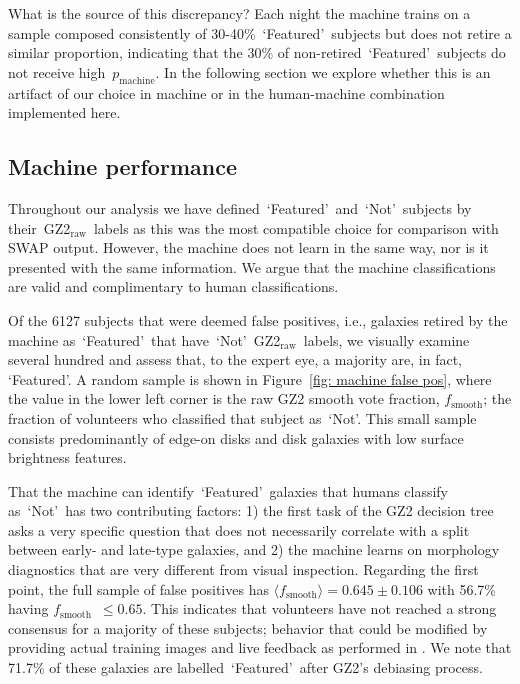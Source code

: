 \documentclass[twocolumn, trackchanges, linenumbers]{aastex6}%
\newcommand{\feat}{`Featured'}
\newcommand{\notfeat}{`Not'}
\newcommand{\raw}{GZ2$_{\text{raw}}$}
\newcommand{\pmachine}{$p_{\mathrm{machine}}$}
\newcommand{\fsmooth}{$f_{\mathrm{smooth}}$}
\begin{document}
What is the source of this discrepancy? 
Each night the machine trains on a sample composed consistently of 30-40\%~\feat~subjects but does not retire a similar proportion, indicating
that the 30\% of non-retired~\feat~subjects do not receive high~\pmachine. 
In the following section we explore whether this is an artifact of our choice in machine 
or in the human-machine combination implemented here. 


\subsection{Machine performance}\label{sec: machine performance}

Throughout our analysis we have defined~\feat~and~\notfeat~subjects by 
their~\raw~labels as this was the most compatible choice for comparison with SWAP output.  
However, the machine does not learn in the same way, nor is it presented with the 
same information. We argue that the machine classifications are valid 
and complimentary to human classifications. 

Of the 6127 subjects that were deemed false positives, i.e., galaxies retired by the 
machine as~\feat~that have~\notfeat~\raw~labels, we visually examine several hundred
and assess that, to the expert eye, a majority are, in fact, \feat.  
A random sample is shown in Figure~\ref{fig: machine false pos}, where the value 
in the lower left corner is the raw GZ2 smooth vote fraction, \fsmooth; 
the fraction of volunteers who classified that subject as~\notfeat. 
This small sample consists predominantly of edge-on disks and disk 
galaxies with low surface brightness features. 

That the machine can identify~\feat~galaxies that humans classify 
as~\notfeat~has two contributing factors: 
1) the first task of the GZ2 decision tree asks a very specific question that 
does not necessarily correlate with a split between early- and late-type galaxies, and 
 2) the machine learns on morphology diagnostics that are very different from visual inspection. 
Regarding the first point, the full sample of false positives has $\langle f_{\mathrm{smooth}} \rangle = 0.645 \pm 0.106$  with 56.7\%  having \fsmooth~$\le 0.65$. This indicates that volunteers have not 
reached a strong consensus for a majority of these subjects; behavior that could 
be modified by providing actual training images and live feedback as performed in \cite{Marshall2016}. 
We note that 71.7\% of these galaxies are labelled~\feat~after GZ2's debiasing process. 
\end{document}
